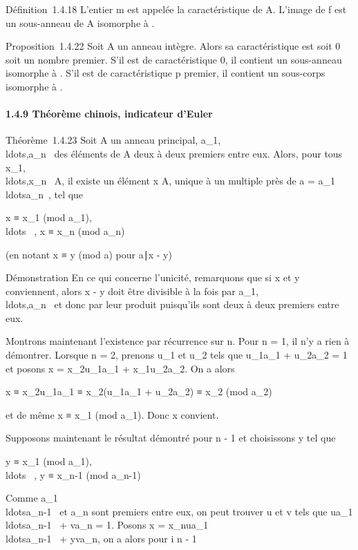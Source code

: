 \documentclass[]{article}
\begin{document}
Définition~1.4.18 L'entier m est appelée la caractéristique de A.
L'image de f est un sous-anneau de A isomorphe à \diagupm{}.

Proposition~1.4.22 Soit A un anneau intègre. Alors sa caractéristique
est soit 0 soit un nombre premier. S'il est de caractéristique 0, il
contient un sous-anneau isomorphe à . S'il est de caractéristique p
premier, il contient un sous-corps isomorphe à \diagupp{}.

\paragraph{1.4.9 Théorème chinois, indicateur d'Euler}

Théorème~1.4.23 Soit A un anneau principal,
a_1,\\ldots,a_n~
des éléments de A deux à deux premiers entre eux. Alors, pour tous
x_1,\\ldots,x_n~
\in A, il existe un élément x \in A, unique à un multiple près de a =
a_1\\ldotsa_n~,
tel que

x ≡ x_1
(mod\,\,a_1),\quad
\\ldots~\quad
, x ≡ x_n (mod\,\,a_n)

(en notant x ≡ y (mod\,\,a) pour
a∣x - y)

Démonstration En ce qui concerne l'unicité, remarquons que si x et y
conviennent, alors x - y doit être divisible à la fois par
a_1,\\ldots,a_n~
et donc par leur produit puisqu'ils sont deux à deux premiers entre eux.

Montrons maintenant l'existence par récurrence sur n. Pour n = 1, il n'y
a rien à démontrer. Lorsque n = 2, prenons u_1 et u_2
tels que u_1a_1 + u_2a_2 = 1 et
posons x = x_2u_1a_1 +
x_1u_2a_2. On a alors

x ≡ x_2u_1a_1 ≡
x_2(u_1a_1 + u_2a_2) ≡
x_2 (mod\,\,a_2)

et de même x ≡ x_1
(mod\,\,a_1). Donc x convient.

Supposons maintenant le résultat démontré pour n - 1 et choisissons y
tel que

y ≡ x_1
(mod\,\,a_1),\quad
\\ldots~\quad
, y ≡ x_n-1
(mod\,\,a_n-1)

Comme
a_1\\ldotsa_n-1~
et a_n sont premiers entre eux, on peut trouver u et v tels que
ua_1\\ldotsa_n-1~
+ va_n = 1. Posons x =
x_nua_1\\ldotsa_n-1~
+ yva_n, on a alors pour i \leq n - 1
\end{document}
